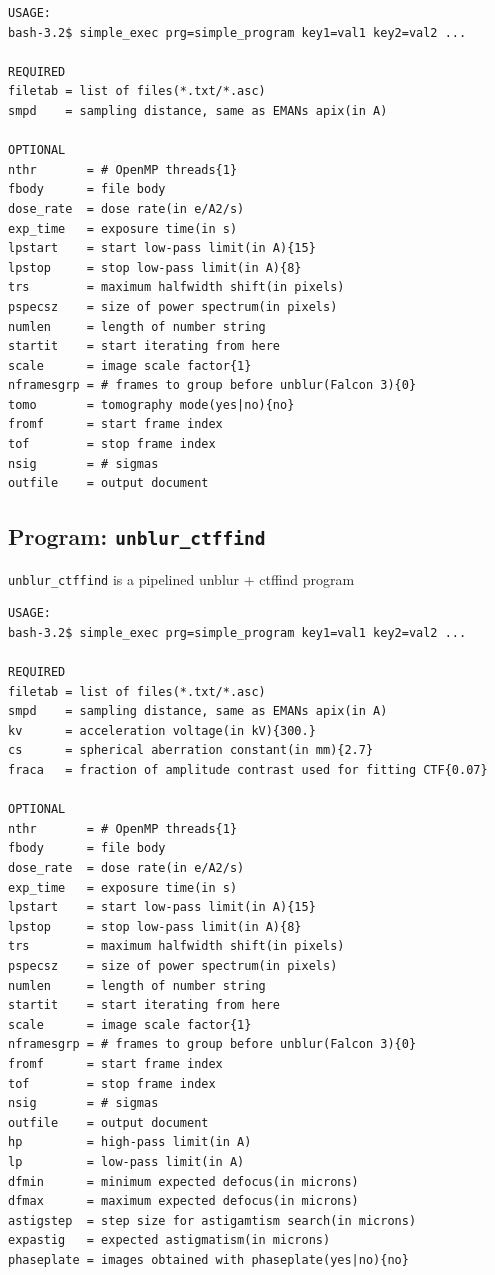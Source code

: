 \documentclass[a4paper,11pt]{article}
\newcommand{\prgname}[1]{\textcolor{NavyBlue}{\texttt{#1}}}
\begin{document}
\begin{verbatim}
USAGE:
bash-3.2$ simple_exec prg=simple_program key1=val1 key2=val2 ...

REQUIRED
filetab = list of files(*.txt/*.asc)
smpd    = sampling distance, same as EMANs apix(in A)

OPTIONAL
nthr       = # OpenMP threads{1}
fbody      = file body
dose_rate  = dose rate(in e/A2/s)
exp_time   = exposure time(in s)
lpstart    = start low-pass limit(in A){15}
lpstop     = stop low-pass limit(in A){8}
trs        = maximum halfwidth shift(in pixels)
pspecsz    = size of power spectrum(in pixels)
numlen     = length of number string
startit    = start iterating from here
scale      = image scale factor{1}
nframesgrp = # frames to group before unblur(Falcon 3){0}
tomo       = tomography mode(yes|no){no}
fromf      = start frame index
tof        = stop frame index
nsig       = # sigmas
outfile    = output document
\end{verbatim}

\subsection{Program: \prgname{unblur\_ctffind}}
\label{unblur_ctffind}
\prgname{unblur\_ctffind} is a pipelined unblur + ctffind program

\begin{verbatim}
USAGE:
bash-3.2$ simple_exec prg=simple_program key1=val1 key2=val2 ...

REQUIRED
filetab = list of files(*.txt/*.asc)
smpd    = sampling distance, same as EMANs apix(in A)
kv      = acceleration voltage(in kV){300.}
cs      = spherical aberration constant(in mm){2.7}
fraca   = fraction of amplitude contrast used for fitting CTF{0.07}

OPTIONAL
nthr       = # OpenMP threads{1}
fbody      = file body
dose_rate  = dose rate(in e/A2/s)
exp_time   = exposure time(in s)
lpstart    = start low-pass limit(in A){15}
lpstop     = stop low-pass limit(in A){8}
trs        = maximum halfwidth shift(in pixels)
pspecsz    = size of power spectrum(in pixels)
numlen     = length of number string
startit    = start iterating from here
scale      = image scale factor{1}
nframesgrp = # frames to group before unblur(Falcon 3){0}
fromf      = start frame index
tof        = stop frame index
nsig       = # sigmas
outfile    = output document
hp         = high-pass limit(in A)
lp         = low-pass limit(in A)
dfmin      = minimum expected defocus(in microns)
dfmax      = maximum expected defocus(in microns)
astigstep  = step size for astigamtism search(in microns)
expastig   = expected astigmatism(in microns)
phaseplate = images obtained with phaseplate(yes|no){no}
\end{verbatim}
\end{document}
